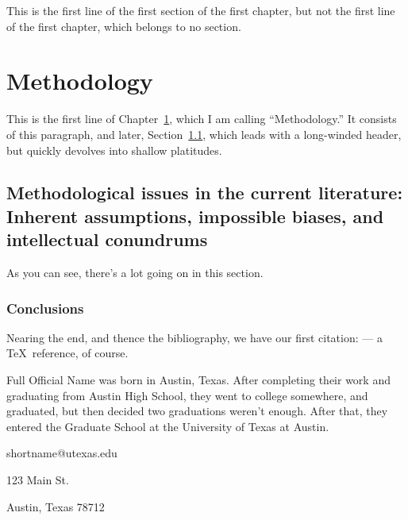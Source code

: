 \documentclass{utexasthesis}
\begin{document}
This is the first line of the first section of the first chapter, but not the first line of the first chapter, which belongs to no section.


\chapter{Methodology}
\label{chap:methodology}

This is the first line of Chapter~\ref{chap:methodology}, which I am calling ``Methodology.''
It consists of this paragraph, and later, Section~\ref{sec:method-issues}, which leads with a long-winded header, but quickly devolves into shallow platitudes.

\section{Methodological issues in the current literature: Inherent assumptions, impossible biases, and intellectual conundrums}
\label{sec:method-issues}

As you can see, there's a lot going on in this section.

\subsection{Conclusions}

Nearing the end, and thence the bibliography, we have our first citation: \citet{knuth:texbook} --- a \TeX\ reference, of course.



\begin{vita}
  Full Official Name was born in Austin, Texas. After completing their work and graduating from Austin High School, they went to college somewhere, and graduated, but then decided two graduations weren't enough.
  After that, they entered the Graduate School at the University of Texas at Austin.

  \begin{address}
    shortname@utexas.edu

    123 Main St.

    Austin, Texas 78712
  \end{address}

\end{vita}
\end{document}
